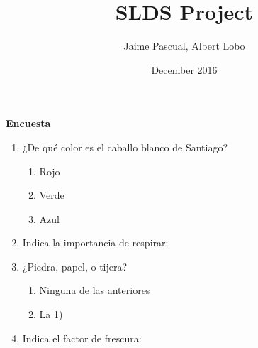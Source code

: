 \documentclass{article}
\title{SLDS Project}
\author{Jaime Pascual, Albert Lobo}
\date{December 2016}
\begin{document}
\textbf{Encuesta}

\begin{enumerate}
  \item ¿De qué color es el caballo blanco de Santiago?
    \begin{enumerate}[label=\arabic*)]
      \item Rojo
      \item Verde
      \item Azul
    \end{enumerate}
  \item Indica la importancia de respirar: \\
  \vspace{500ex}
  \item ¿Piedra, papel, o tijera?
    \begin{enumerate}[label=\arabic*)]
      \item Ninguna de las anteriores
      \item La 1)
    \end{enumerate}
  \item Indica el factor de frescura: \\
\end{enumerate}
\end{document}
